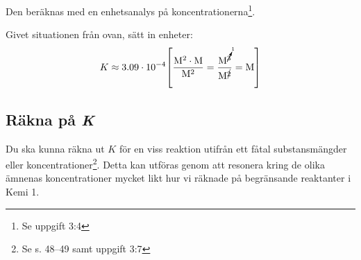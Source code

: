 Den beräknas med en enhetsanalys på koncentrationerna\footnote{Se uppgift 3:4}.

\begin{exm}
    Givet situationen från ovan, sätt in enheter:
    \begin{equation*}
        K \approx 3.09 \cdot 10^{-4} \mathrm{ \left[\frac{M^2 \cdot M}{M^2} = \frac{M^{\cancelto{1}{3}}}{M^{\cancel{2}}} = M\right]}
    \end{equation*}
\end{exm}

\subsection{Räkna på \textit{K}}
\label{sec:räknak}
Du ska kunna räkna ut $K$ för en viss reaktion utifrån ett fåtal substansmängder eller koncentrationer\footnote{Se s. 48--49 samt uppgift 3:7}. Detta kan utföras genom att resonera kring de olika ämnenas koncentrationer mycket likt hur vi räknade på begränsande reaktanter i Kemi 1.

